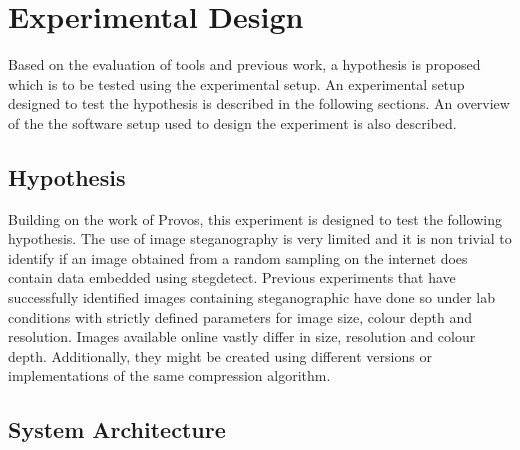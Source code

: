 \chapter{Experimental Design}
\label{ch:dev}
Based on the evaluation of tools and previous work, a hypothesis is proposed which is to be tested using the experimental setup. An experimental setup designed to test the hypothesis is described in the following sections. An overview of the the software setup used to design the experiment is also described.
\section{Hypothesis}
Building on the work of Provos, this experiment is designed to test the following hypothesis. The use of image steganography is very limited and it is non trivial to identify if an image obtained from a random sampling on the internet does contain data embedded using stegdetect. Previous experiments that have successfully identified images containing steganographic have done so under lab conditions with strictly defined parameters for image size, colour depth and resolution. Images available online vastly differ in size, resolution and colour depth. Additionally, they might be created using different versions or implementations of the same compression algorithm. 
\section{System Architecture}
\label{sec:sysarch}


